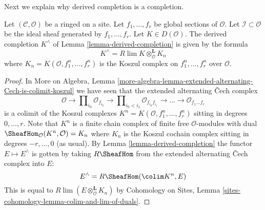 \noindent
Next we explain why derived completion is a completion.

\begin{lemma}
\label{lemma-derived-completion-koszul}
Let $(\mathcal{C}, \mathcal{O})$ be a ringed on a site. Let $f_1, \ldots, f_r$
be global sections of $\mathcal{O}$. Let $\mathcal{I} \subset \mathcal{O}$ be
the ideal sheaf generated by $f_1, \ldots, f_r$. Let $K \in D(\mathcal{O})$.
The derived completion $K^\wedge$ of Lemma \ref{lemma-derived-completion}
is given by the formula
$$
K^\wedge = R\lim K \otimes^\mathbf{L}_\mathcal{O} K_n
$$
where $K_n = K(\mathcal{O}, f_1^n, \ldots, f_r^n)$
is the Koszul complex on $f_1^n, \ldots, f_r^n$ over $\mathcal{O}$.
\end{lemma}

\begin{proof}
In More on Algebra, Lemma
\ref{more-algebra-lemma-extended-alternating-Cech-is-colimit-koszul}
we have seen that the extended alternating {\v C}ech complex
$$
\mathcal{O} \to \prod\nolimits_{i_0} \mathcal{O}_{f_{i_0}} \to
\prod\nolimits_{i_0 < i_1} \mathcal{O}_{f_{i_0}f_{i_1}} \to
\ldots \to \mathcal{O}_{f_1\ldots f_r}
$$
is a colimit of the Koszul complexes
$K^n = K(\mathcal{O}, f_1^n, \ldots, f_r^n)$ sitting in
degrees $0, \ldots, r$. Note that $K^n$ is a finite chain complex
of finite free $\mathcal{O}$-modules with dual
$\SheafHom_\mathcal{O}(K^n, \mathcal{O}) = K_n$ where $K_n$ is the Koszul
cochain complex sitting in degrees $-r, \ldots, 0$ (as usual). By
Lemma \ref{lemma-derived-completion}
the functor $E \mapsto E^\wedge$ is gotten by taking
$R\SheafHom$ from the extended alternating {\v C}ech complex into $E$:
$$
E^\wedge = R\SheafHom(\colim K^n, E)
$$
This is equal to $R\lim (E \otimes_\mathcal{O}^\mathbf{L} K_n)$
by
Cohomology on Sites, Lemma \ref{sites-cohomology-lemma-colim-and-lim-of-duals}.
\end{proof}

